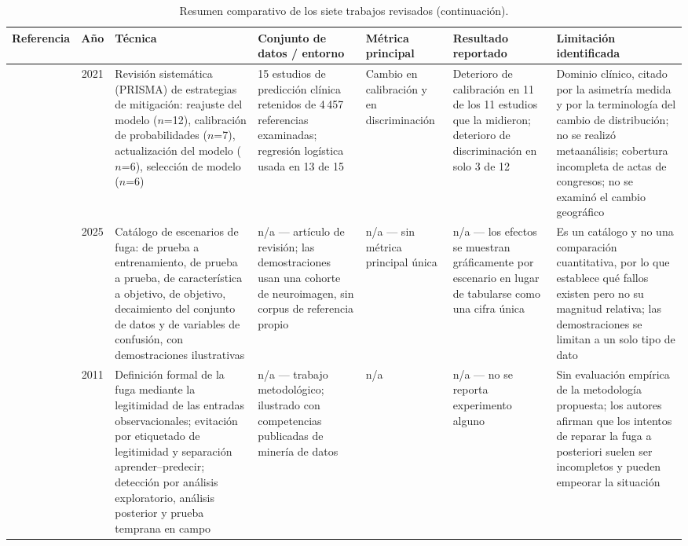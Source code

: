 \documentclass[conference]{IEEEtran}
\begin{document}
\begin{table}[!tp]

\addtocounter{table}{-1}

\centering
\caption{Resumen comparativo de los siete trabajos revisados
(continuaci\'on).}
\label{tab:comparative-cont}

\footnotesize
\setlength{\tabcolsep}{3.5pt}

\begin{tabularx}{\textwidth}{@{}l c P{2.05cm} P{2.35cm} P{1.5cm} P{2.35cm} Y@{}}
\toprule
\textbf{Referencia} & \textbf{A\~no} & \textbf{T\'ecnica} &
\textbf{Conjunto de datos / entorno} & \textbf{M\'etrica principal} &
\textbf{Resultado reportado} & \textbf{Limitaci\'on identificada}\\
\midrule

\cite{guo_temporalshift_2021} & 2021 &
Revisi\'on sistem\'atica (PRISMA) de estrategias de mitigaci\'on: reajuste
del modelo ($n$=12), calibraci\'on de probabilidades ($n$=7),
actualizaci\'on del modelo ($n$=6), selecci\'on de modelo ($n$=6) &
15 estudios de predicci\'on cl\'inica retenidos de 4\,457 referencias
examinadas; regresi\'on log\'istica usada en 13 de 15 &
Cambio en calibraci\'on y en discriminaci\'on &
Deterioro de calibraci\'on en 11 de los 11 estudios que la midieron;
deterioro de discriminaci\'on en solo 3 de 12 &
Dominio cl\'inico, citado por la asimetr\'ia medida y por la terminolog\'ia
del cambio de distribuci\'on; no se realiz\'o metaan\'alisis; cobertura
incompleta de actas de congresos; no se examin\'o el cambio geogr\'afico\\
\addlinespace

\cite{sasse_leakage_2025} & 2025 &
Cat\'alogo de escenarios de fuga: de prueba a entrenamiento, de prueba a
prueba, de caracter\'istica a objetivo, de objetivo, decaimiento del
conjunto de datos y de variables de confusi\'on, con demostraciones
ilustrativas &
n/a --- art\'iculo de revisi\'on; las demostraciones usan una cohorte de
neuroimagen, sin corpus de referencia propio &
n/a --- sin m\'etrica principal \'unica &
n/a --- los efectos se muestran gr\'aficamente por escenario en lugar de
tabularse como una cifra \'unica &
Es un cat\'alogo y no una comparaci\'on cuantitativa, por lo que establece
qu\'e fallos existen pero no su magnitud relativa; las demostraciones se
limitan a un solo tipo de dato\\
\addlinespace

\cite{kaufman_leakage_2011} & 2011 &
Definici\'on formal de la fuga mediante la legitimidad de las entradas
observacionales; evitaci\'on por etiquetado de legitimidad y separaci\'on
aprender--predecir; detecci\'on por an\'alisis exploratorio, an\'alisis
posterior y prueba temprana en campo &
n/a --- trabajo metodol\'ogico; ilustrado con competencias publicadas de
miner\'ia de datos &
n/a &
n/a --- no se reporta experimento alguno &
Sin evaluaci\'on emp\'irica de la metodolog\'ia propuesta; los autores
afirman que los intentos de reparar la fuga a posteriori suelen ser
incompletos y pueden empeorar la situaci\'on\\


\end{tabularx}
\end{table}
\end{document}
